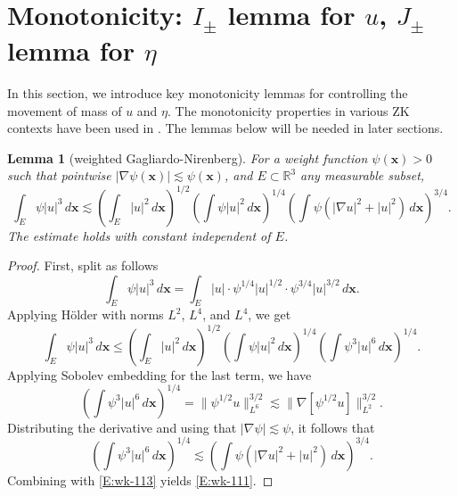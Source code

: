 \documentclass[12pt,letterpaper]{amsart}
\newtheorem{lemma}[theorem]{Lemma}
\theoremstyle{remark}
\numberwithin{equation}{section}
\numberwithin{theorem}{section}
\numberwithin{table}{section}
\begin{document}
\section{Monotonicity:  $I_\pm$ lemma for $u$, $J_{\pm}$ lemma for $\eta$}
\label{S:monotonicity}


In this section, we introduce key monotonicity lemmas for controlling the movement of mass of $u$ and $\eta$. The monotonicity properties in various ZK contexts have been used in \cite{FHRY, FHR2, FHR3}. The lemmas below will be needed in later sections.  

\begin{lemma}[weighted Gagliardo-Nirenberg]
\label{L:weighted-GN}
For a weight function $\psi(\mathbf{x})>0$ such that pointwise $|\nabla \psi (\mathbf{x})| \lesssim \psi(\mathbf{x})$, and $E\subset \mathbb{R}^3$ any measurable subset, 
\begin{equation}
\label{E:wk-111}
\int_{E} \psi |u|^3 \, d \mathbf{x} \lesssim  \left( \int_{E} |u|^2 \, d\mathbf{x} \right)^{1/2} \left( \int \psi |u|^2 \, d\mathbf{x} \right)^{1/4} \left( \int \psi (|\nabla u|^2 + |u|^2) \, d \mathbf{x} \right)^{3/4}.
\end{equation}
The estimate holds with constant independent of $E$.
\end{lemma}
\begin{proof}
First, split as follows
$$
\int_E \psi |u|^3 \,d \mathbf{x} = \int_E |u| \cdot \psi^{1/4} |u|^{1/2} \cdot \psi^{3/4} |u|^{3/2} \,d \mathbf{x}.
$$
Applying H\"older with norms $L^2$, $L^4$, and $L^4$, we get
\begin{equation}
\label{E:wk-113}
\int_E \psi |u|^3 \,d \mathbf{x} \leq  \left( \int_E |u|^2\, d\mathbf{x} \right)^{1/2} \left( \int \psi |u|^2\, d\mathbf{x} \right)^{1/4} \left( \int \psi^3 |u|^6 \, d \mathbf{x} \right)^{1/4}.
\end{equation}
Applying Sobolev embedding for the last term, we have
$$ 
\left( \int \psi^3 |u|^6 \, d \mathbf{x} \right)^{1/4} = \|\psi^{1/2} u \|_{L^6}^{3/2} \lesssim \| \nabla[\psi^{1/2} u ] \|_{L^2}^{3/2}. 
$$
Distributing the derivative and using that $|\nabla \psi| \lesssim \psi$, it follows that
$$ 
\left( \int \psi^3 |u|^6 \, d \mathbf{x} \right)^{1/4} \lesssim \left( \int \psi( |\nabla u|^2+|u|^2) \, d \mathbf{x} \right)^{3/4}.
$$
Combining with \eqref{E:wk-113} yields \eqref{E:wk-111}.    
\end{proof}
\end{document}
